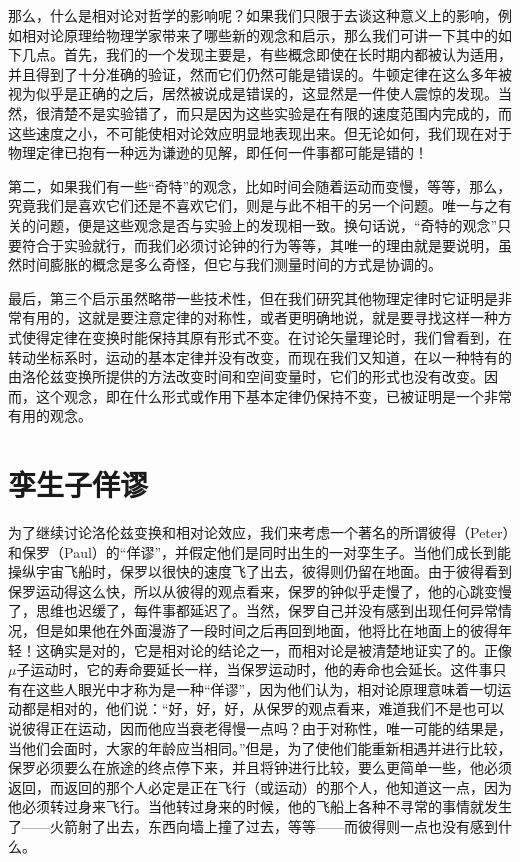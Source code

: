 那么，什么是相对论对哲学的影响呢？如果我们只限于去谈这种意义上的影响，例如相对论原理给物理学家带来了哪些新的观念和启示，那么我们可讲一下其中的如下几点。首先，我们的一个发现主要是，有些概念即使在长时期内都被认为适用，并且得到了十分准确的验证，然而它们仍然可能是错误的。牛顿定律在这么多年被视为似乎是正确的之后，居然被说成是错误的，这显然是一件使人震惊的发现。当然，很清楚不是实验错了，而只是因为这些实验是在有限的速度范围内完成的，而这些速度之小，不可能使相对论效应明显地表现出来。但无论如何，我们现在对于物理定律已抱有一种远为谦逊的见解，即任何一件事都可能是错的！

第二，如果我们有一些“奇特”的观念，比如时间会随着运动而变慢，等等，那么，究竟我们是喜欢它们还是不喜欢它们，则是与此不相干的另一个问题。唯一与之有关的问题，便是这些观念是否与实验上的发现相一致。换句话说，“奇特的观念”只要符合于实验就行，而我们必须讨论钟的行为等等，其唯一的理由就是要说明，虽然时间膨胀的概念是多么奇怪，但它与我们测量时间的方式是协调的。

最后，第三个启示虽然略带一些技术性，但在我们研究其他物理定律时它证明是非常有用的，这就是要注意定律的对称性，或者更明确地说，就是要寻找这样一种方式使得定律在变换时能保持其原有形式不变。在讨论矢量理论时，我们曾看到，在转动坐标系时，运动的基本定律并没有改变，而现在我们又知道，在以一种特有的由洛伦兹变换所提供的方法改变时间和空间变量时，它们的形式也没有改变。因而，这个观念，即在什么形式或作用下基本定律仍保持不变，已被证明是一个非常有用的观念。

\section{孪生子佯谬}

为了继续讨论洛伦兹变换和相对论效应，我们来考虑一个著名的所谓彼得（Peter）和保罗（Paul）的“佯谬”，并假定他们是同时出生的一对孪生子。当他们成长到能操纵宇宙飞船时，保罗以很快的速度飞了出去，彼得则仍留在地面。由于彼得看到保罗运动得这么快，所以从彼得的观点看来，保罗的钟似乎走慢了，他的心跳变慢了，思维也迟缓了，每件事都延迟了。当然，保罗自己并没有感到出现任何异常情况，但是如果他在外面漫游了一段时间之后再回到地面，他将比在地面上的彼得年轻！这确实是对的，它是相对论的结论之一，而相对论是被清楚地证实了的。正像$\mu$子运动时，它的寿命要延长一样，当保罗运动时，他的寿命也会延长。这件事只有在这些人眼光中才称为是一种“佯谬”，因为他们认为，相对论原理意味着一切运动都是相对的，他们说：“好，好，好，从保罗的观点看来，难道我们不是也可以说彼得正在运动，因而他应当衰老得慢一点吗？由于对称性，唯一可能的结果是，当他们会面时，大家的年龄应当相同。”但是，为了使他们能重新相遇并进行比较，保罗必须要么在旅途的终点停下来，并且将钟进行比较，要么更简单一些，他必须返回，而返回的那个人必定是正在飞行（或运动）的那个人，他知道这一点，因为他必须转过身来飞行。当他转过身来的时候，他的飞船上各种不寻常的事情就发生了——火箭射了出去，东西向墙上撞了过去，等等——而彼得则一点也没有感到什么。

